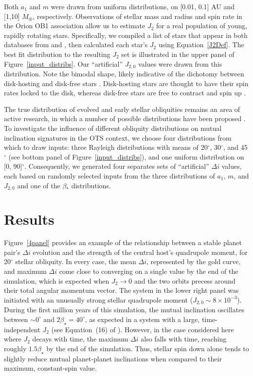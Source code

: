\documentclass[twocolumn]{aastex63}
\begin{document}
Both \(a_1\) and \(m\) were drawn from uniform distributions, on [0.01, 0.1] AU and [1,10] \(M_\oplus\), respectively. Observations of stellar mass and radius \citep{2005AJ....129..907B} and spin rate \citep{2016AJ....152..198K} in the Orion OB1 association allow us to estimate $J_2$ for a real population of young, rapidly rotating stars. Specifically, we compiled a list of stars that appear in both databases from \cite{2005AJ....129..907B} and \cite{2016AJ....152..198K}, then calculated each star’s \(J_2\) using Equation~\ref{J2Def}. The best fit distribution to the resulting \(J_2\) set is illustrated in the upper panel of Figure~\ref{input_distribs}. Our “artificial” \(J_{2,0}\) values were drawn from this distribution. Note the bimodal shape, likely indicative of the dichotomy between disk-hosting and disk-free stars \citep{rebull2018rotation}. Disk-hosting stars are thought to have their spin rates locked to the disk, whereas disk-free stars are free to contract and spin up \citep{armitage1996magnetic}.

The true distribution of evolved and early stellar obliquities remains an area of active research, in which a number of possible distributions have been proposed \citep{fabrycky2009exoplanetary,winn2017constraints}. To investigate the influence of different obliquity distributions on mutual inclination signatures in the OTS context, we choose four distributions from which to draw inputs: three Rayleigh distributions with means of 20$^{\circ}$, 30$^{\circ}$, and 45$^{\circ}$ (see bottom panel of Figure~\ref{input_distribs}),
and one uniform distribution on [0, 90]$^{\circ}$.
Consequently, we generated four separates sets of “artificial” \(\Delta i\) values, each based on randomly selected inputs from the three distributions of \(a_1\), \(m\), and \(J_{2,0}\) and one of the \(\beta_*\) distributions.

\section{Results}\label{sec: Results}
Figure~\ref{4panel} provides an example of the relationship between a stable planet pair’s \(\Delta i\) evolution and the strength of the central host’s quadrupole moment, for 20$^{\circ}$ stellar obliquity. In every case, the mean \(\Delta i\), represented by the gold curve, and maximum \(\Delta i\) come close to converging on a single value by the end of the simulation, which is expected when $J_2\rightarrow0$ and the two orbits precess around their total angular momentum vector. The system in the lower right panel was initiated with an unusually strong stellar quadrupole moment ($J_{2,0}\sim 8\times 10^{-3}$). During the first million years of this simulation, the mutual inclination oscillates between $\sim0^\circ$ and $2\beta_\star=40^\circ$, as expected in a system with a large, time-independent $J_2$ (see Equation~(16) of \citealt{spalding2016spin}). However, in the case considered here where $J_2$ decays with time, the maximum \(\Delta i\) also falls with time, reaching roughly $1.5\beta_\star$ by the end of the simulation. Thus, stellar spin down alone tends to slightly reduce mutual planet-planet inclinations when compared to their maximum, constant-spin value.
\end{document}
